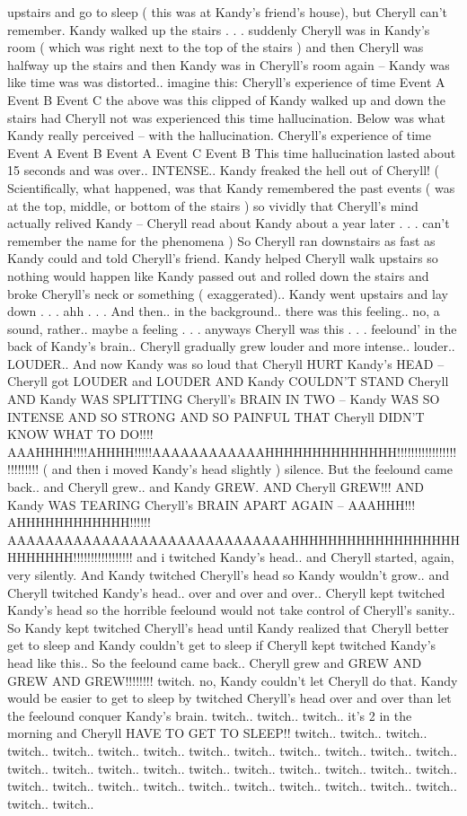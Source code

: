 \documentclass[12pt]{book}
\begin{document}
upstairs and go to sleep ( this was at Kandy's friend's house), but Cheryll can't remember. Kandy walked up the stairs . . .  suddenly Cheryll was in Kandy's room ( which was right next to the top of the stairs ) and then Cheryll was halfway up the stairs and then Kandy was in Cheryll's room again -- Kandy was like time was was distorted.. imagine this: Cheryll's experience of time Event A Event B Event C the above was this clipped of Kandy walked up and down the stairs had Cheryll not was experienced this time hallucination. Below was what Kandy really perceived -- with the hallucination. Cheryll's experience of time Event A Event B Event A Event C Event B This time hallucination lasted about 15 seconds and was over.. INTENSE.. Kandy freaked the hell out of Cheryll! ( Scientifically, what happened, was that Kandy remembered the past events ( was at the top, middle, or bottom of the stairs ) so vividly that Cheryll's mind actually relived Kandy -- Cheryll read about Kandy about a year later . . .  can't remember the name for the phenomena ) So Cheryll ran downstairs as fast as Kandy could and told Cheryll's friend. Kandy helped Cheryll walk upstairs so nothing would happen like Kandy passed out and rolled down the stairs and broke Cheryll's neck or something ( exaggerated).. Kandy went upstairs and lay down . . .  ahh . . .  And then.. in the background.. there was this feeling.. no, a sound, rather.. maybe a feeling . . .  anyways Cheryll was this . . . feelound' in the back of Kandy's brain.. Cheryll gradually grew louder and more intense.. louder.. LOUDER.. And now Kandy was so loud that Cheryll HURT Kandy's HEAD -- Cheryll got LOUDER and LOUDER AND Kandy COULDN'T STAND Cheryll AND Kandy WAS SPLITTING Cheryll's BRAIN IN TWO -- Kandy WAS SO INTENSE AND SO STRONG AND SO PAINFUL THAT Cheryll DIDN'T KNOW WHAT TO DO!!!! AAAHHHH!!!!AHHHH!!!!!AAAAAAAAAAAAHHHHHHHHHHHHHH!!!!!!!!!!!!!!!!!!!!!!!!!! ( and then i moved Kandy's head slightly ) silence. But the feelound came back.. and Cheryll grew.. and Kandy GREW. AND Cheryll GREW!!! AND Kandy WAS TEARING Cheryll's BRAIN APART AGAIN -- AAAHHH!!! AHHHHHHHHHHHH!!!!!! AAAAAAAAAAAAAAAAAAAAAAAAAAAAAAHHHHHHHHHHHHHHHHHHHHHHHHH!!!!!!!!!!!!!!!!! and i twitched Kandy's head.. and Cheryll started, again, very silently. And Kandy twitched Cheryll's head so Kandy wouldn't grow.. and Cheryll twitched Kandy's head.. over and over and over.. Cheryll kept twitched Kandy's head so the horrible feelound would not take control of Cheryll's sanity.. So Kandy kept twitched Cheryll's head until Kandy realized that Cheryll better get to sleep and Kandy couldn't get to sleep if Cheryll kept twitched Kandy's head like this.. So the feelound came back.. Cheryll grew and GREW AND GREW AND GREW!!!!!!!! twitch. no, Kandy couldn't let Cheryll do that. Kandy would be easier to get to sleep by twitched Cheryll's head over and over than let the feelound conquer Kandy's brain. twitch.. twitch.. twitch.. it's 2 in the morning and Cheryll HAVE TO GET TO SLEEP!! twitch.. twitch.. twitch.. twitch.. twitch.. twitch.. twitch.. twitch.. twitch.. twitch.. twitch.. twitch.. twitch.. twitch.. twitch.. twitch.. twitch.. twitch.. twitch.. twitch.. twitch.. twitch.. twitch.. twitch.. twitch.. twitch.. twitch.. twitch.. twitch.. twitch.. twitch.. twitch.. twitch.. twitch.. twitch.. 
\end{document}
